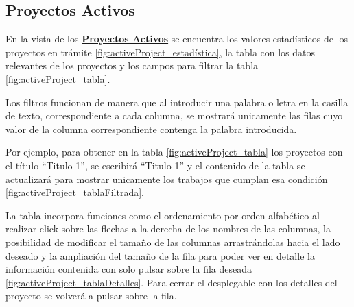 

\subsection{Proyectos Activos} 
En la vista de los \textbf{\href{https://gestor-tfg-2021.herokuapp.com/active-projects}{Proyectos Activos}} se encuentra los valores estadísticos de los proyectos en trámite \ref{fig:activeProject_estadística}, la tabla con los datos relevantes de los proyectos y los campos para filtrar la tabla \ref{fig:activeProject_tabla}.



Los filtros funcionan de manera que al introducir una palabra o letra en la casilla de texto, correspondiente a cada columna, se mostrará unicamente las filas cuyo valor de la columna correspondiente contenga la palabra introducida. 

Por ejemplo, para obtener en la tabla \ref{fig:activeProject_tabla} los proyectos con el título ``Titulo 1'', se escribirá ``Titulo 1'' y el contenido de la tabla se actualizará para mostrar unicamente los trabajos que cumplan esa condición \ref{fig:activeProject_tablaFiltrada}.


La tabla incorpora funciones como el ordenamiento por orden alfabético al realizar click sobre las flechas a la derecha de los nombres de las columnas, la posibilidad de modificar el tamaño de las columnas arrastrándolas hacia el lado deseado y la ampliación del tamaño de la fila para poder ver en detalle la información contenida con solo pulsar sobre la fila deseada \ref{fig:activeProject_tablaDetalles}. Para cerrar el desplegable con los detalles del proyecto se volverá a pulsar sobre la fila.


